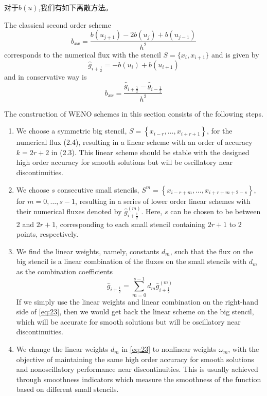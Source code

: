 \documentclass[12pt]{article}
\begin{document}
对于$b(u)$,我们有如下离散方法。\cite{doi:10.1137/100791002}

The classical second order scheme
\begin{equation}
	b_{xx}=\frac{b(u_{j+1})-2b(u_{j})+b(u_{j-1})}{h^2}
\end{equation}
corresponds to the numerical flux with the stencil $S = \{x_i,x_{i+1}\}$ and is given by
\begin{equation}
	\hat{g}_{i+\frac{1}{2}}=-b\left(u_{i}\right)+b\left(u_{i+1}\right)
\end{equation}
and in conservative way is
\begin{equation}
	b_{xx} = \frac{\hat{g}_{i+\frac{1}{2}}-\hat{g}_{i-\frac{1}{2}}}{h^2}
\end{equation}

The construction of WENO schemes in this section consists of the following steps.

\begin{enumerate}
	\item We choose a symmetric big stencil, $S=\left\{x_{i-r}, \ldots, x_{i+r+1}\right\}$, for the numerical flux (2.4), resulting in a linear scheme with an order of accuracy $k=2 r+2$ in (2.3). This linear scheme should be stable with the designed high order accuracy for smooth solutions but will be oscillatory near discontinuities.
	\item We choose $s$ consecutive small stencils, $S^{m}=\left\{x_{i-r+m}, \ldots, x_{i+r+m+2-s}\right\}$, for $m=0, \ldots, s-1$, resulting in a series of lower order linear schemes with their numerical fluxes denoted by $\hat{g}_{i+\frac{1}{2}}^{(m)}$. Here, $s$ can be chosen to be between 2 and $2 r+1$, corresponding to each small stencil containing $2 r+1$ to 2 points, respectively.
	\item We find the linear weights, namely, constants $d_{m}$, such that the flux on the big stencil is a linear combination of the fluxes on the small stencils with $d_{m}$ as the combination coefficients
	      \begin{equation}
		      \hat{g}_{i+\frac{1}{2}}=\sum_{m=0}^{s-1} d_{m} \hat{g}_{i+\frac{1}{2}}^{(m)}
		      \label{eq:23}
	      \end{equation}
	      If we simply use the linear weights and linear combination on the right-hand side of \cref{eq:23}, then we would get back the linear scheme on the big stencil, which will be accurate for smooth solutions but will be oscillatory near discontinuities.
	\item We change the linear weights $d_{m}$ in \cref{eq:23} to nonlinear weights $\omega_{m}$, with the objective of maintaining the same high order accuracy for smooth solutions and nonoscillatory performance near discontinuities. This is usually achieved through smoothness indicators which measure the smoothness of the function based on different small stencils.
\end{enumerate}
\end{document}
